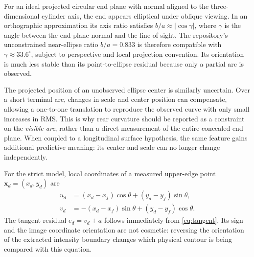 \documentclass[11pt,letterpaper]{article}
\newcommand{\mat}[1]{\mathbf{#1}}
\begin{document}
For an ideal projected circular end plane with normal aligned to the three-dimensional cylinder axis, the end appears elliptical under oblique viewing. In an orthographic approximation its axis ratio satisfies \(b/a\approx|\cos\gamma|\), where \(\gamma\) is the angle between the end-plane normal and the line of sight. The repository's unconstrained near-ellipse ratio \(b/a=0.833\) is therefore compatible with \(\gamma\approx33.6^\circ\), subject to perspective and local projection convention. Its orientation is much less stable than its point-to-ellipse residual because only a partial arc is observed.

The projected position of an unobserved ellipse center is similarly uncertain. Over a short terminal arc, changes in scale and center position can compensate, allowing a one-to-one translation to reproduce the observed curve with only small increases in RMS. This is why rear curvature should be reported as a constraint on the \emph{visible arc}, rather than a direct measurement of the entire concealed end plane. When coupled to a longitudinal surface hypothesis, the same feature gains additional predictive meaning: its center and scale can no longer change independently.

For the strict model, local coordinates of a measured upper-edge point \(\mat x_d=(x_d,y_d)\) are
\begin{align}
 u_d&=(x_d-x_f)\cos\theta+(y_d-y_f)\sin\theta,\\
 v_d&=-(x_d-x_f)\sin\theta+(y_d-y_f)\cos\theta.
\end{align}
The tangent residual \(e_d=v_d+a\) follows immediately from \cref{eq:tangent}. Its sign and the image coordinate orientation are not cosmetic: reversing the orientation of the extracted intensity boundary changes which physical contour is being compared with this equation.
\end{document}
